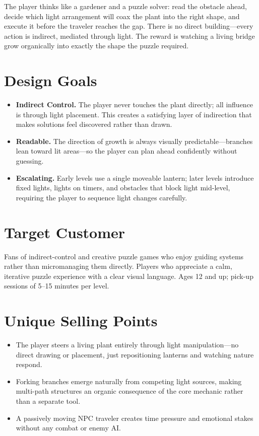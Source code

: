 \documentclass[11pt, letterpaper]{article}
\begin{document}
The player thinks like a gardener and a puzzle solver: read the obstacle ahead, decide which light
arrangement will coax the plant into the right shape, and execute it before the traveler reaches
the gap. There is no direct building---every action is indirect, mediated through light. The reward
is watching a living bridge grow organically into exactly the shape the puzzle required.

\section*{Design Goals}

\begin{itemize}[leftmargin=1.5em, itemsep=2pt]
    \item \textbf{Indirect Control.} The player never touches the plant directly; all influence
    is through light placement. This creates a satisfying layer of indirection that makes
    solutions feel discovered rather than drawn.
    \item \textbf{Readable.} The direction of growth is always visually predictable---branches
    lean toward lit areas---so the player can plan ahead confidently without guessing.
    \item \textbf{Escalating.} Early levels use a single moveable lantern; later levels introduce
    fixed lights, lights on timers, and obstacles that block light mid-level, requiring the player
    to sequence light changes carefully.
\end{itemize}

\section*{Target Customer}

Fans of indirect-control and creative puzzle games who enjoy guiding systems rather than
micromanaging them directly. Players who appreciate a calm, iterative puzzle experience with a
clear visual language. Ages 12 and up; pick-up sessions of 5--15 minutes per level.

\section*{Unique Selling Points}

\begin{itemize}[leftmargin=1.5em, itemsep=2pt]
    \item The player steers a living plant entirely through light manipulation---no direct drawing
    or placement, just repositioning lanterns and watching nature respond.
    \item Forking branches emerge naturally from competing light sources, making multi-path
    structures an organic consequence of the core mechanic rather than a separate tool.
    \item A passively moving NPC traveler creates time pressure and emotional stakes without any
    combat or enemy AI.
\end{itemize}
\end{document}

